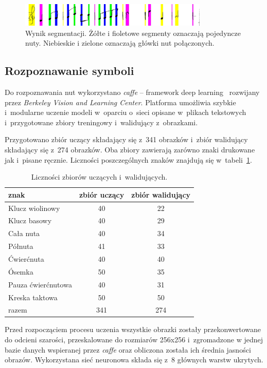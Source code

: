 \documentclass[a4paper,11pt]{article}
\begin{document}
\begin{figure}
\centering
\includegraphics[width=0.8\textwidth]{argb.jpg}
\caption{Wynik segmentacji. Żółte i fioletowe segmenty oznaczają pojedyncze nuty. Niebieskie i zielone oznaczają główki nut połączonych.}
\label{fig:argb}
\end{figure}


\subsection{Rozpoznawanie symboli}

Do rozpoznawania nut wykorzystano \emph{caffe} -- framework deep learning~\cite{jia2014caffe} rozwijany przez \emph{Berkeley Vision and Learning Center}. Platforma umożliwia szybkie i~modularne uczenie modeli w~oparciu o~sieci opisane w~plikach tekstowych i~przygotowane zbiory treningowy i~walidujący z~obrazkami.

Przygotowano zbiór uczący składający się z~341 obrazków i~zbiór walidujący składający się z~274 obrazków. Oba zbiory zawierają zarówno znaki drukowane jak i~pisane ręcznie. Liczności poszczególnych znaków znajdują się w~tabeli~\ref{tab:train_val}.

\begin{table}
\centering
\begin{tabular}{l|c|c}
znak & zbiór uczący & zbiór walidujący \\ \hline
Klucz wiolinowy & 40 & 22 \\
Klucz basowy & 40 & 29 \\
Cała nuta & 40 & 34 \\
Półnuta & 41 & 33 \\
Ćwierćnuta & 40 & 40 \\
Ósemka & 50 & 35 \\
Pauza ćwierćnutowa & 40 & 31 \\
Kreska taktowa & 50 & 50 \\ \hline
razem & 341 & 274 \\
\end{tabular}
\caption{Liczności zbiorów uczących i~walidujących.}
\label{tab:train_val}
\end{table}

Przed rozpocząciem procesu uczenia wszystkie obrazki zostały przekonwertowane do odcieni szarości, przeskalowane do rozmiarów 256x256 i~zgromadzone w jednej bazie danych wspieranej przez \emph{caffe} oraz obliczona została ich średnia jasności obrazów. Wykorzystana sieć neuronowa składa się z~8 głównych warstw ukrytych.
\end{document}
